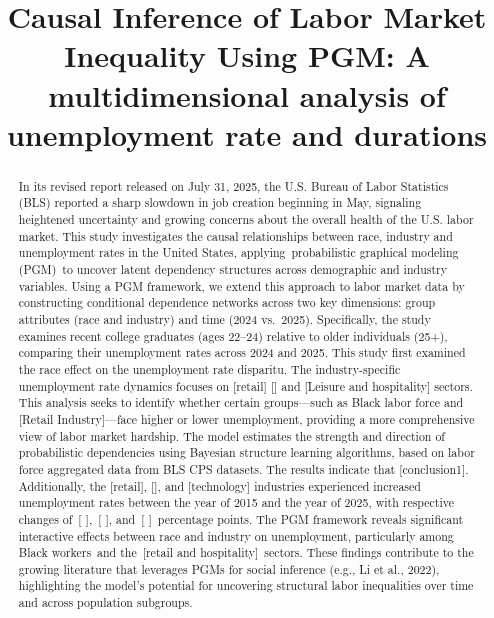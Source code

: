 \documentclass[
]{agujournal2019}
\begin{document}
\title{Causal Inference of Labor Market Inequality Using PGM: A
multidimensional analysis of unemployment rate and durations}




\begin{abstract}
In its revised report released on July 31, 2025, the U.S. Bureau of
Labor Statistics (BLS) reported a sharp slowdown in job creation
beginning in May, signaling heightened uncertainty and growing concerns
about the overall health of the U.S. labor market. This study
investigates the causal relationships between race, industry and
unemployment rates in the United States, applying~probabilistic
graphical modeling (PGM)~to uncover latent dependency structures across
demographic and industry variables. Using a PGM framework, we extend
this approach to labor market data by constructing conditional
dependence networks across two key dimensions: group attributes (race
and industry) and time (2024 vs.~2025). Specifically, the study examines
recent college graduates (ages 22--24) relative to older individuals
(25+), comparing their unemployment rates across 2024 and 2025. This
study first examined the race effect on the unemployment rate disparitu.
The industry-specific unemployment rate dynamics focuses on {[}retail{]}
{[}{]} and {[}Leisure and hospitality{]} sectors. This analysis seeks to
identify whether certain groups---such as Black labor force and
{[}Retail Industry{]}---face higher or lower unemployment, providing a
more comprehensive view of labor market hardship. The model estimates
the strength and direction of probabilistic dependencies using Bayesian
structure learning algorithms, based on labor force aggregated data from
BLS CPS datasets. The results indicate that {[}conclusion1{]}.
Additionally, the {[}retail{]}, {[}{]}, and {[}technology{]} industries
experienced increased unemployment rates between the year of 2015 and
the year of 2025, with respective changes of~{[} {]},~{[} {]}, and~{[}
{]}~percentage points. The PGM framework reveals significant interactive
effects between race and industry on unemployment, particularly among
Black workers~and the~{[}retail and hospitality{]}~sectors. These
findings contribute to the growing literature that leverages PGMs for
social inference (e.g., Li et al., 2022), highlighting the model's
potential for uncovering structural labor inequalities over time and
across population subgroups.
\end{abstract}
\end{document}
